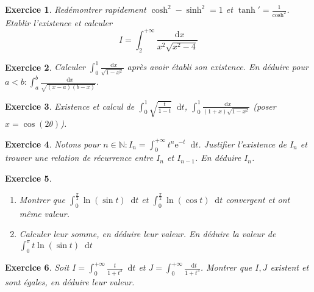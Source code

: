 \documentclass[12pt,a4paper]{article}
\newcommand{\N}{\mathbb{N}}
\newcommand{\E}{\mathrm{e}}
\newcommand{\diff}{\mathop{}\mathopen{}\mathrm{d}}%
{%
\theoremstyle{break}
\theoremprework{%
\rule{0.5\linewidth}{0.3pt}}
\theorempostwork{\hfill%
\rule{0.5\linewidth}{0.3pt}}
\theoremheaderfont{\scshape}
\theoremseparator{ ---}
\newtheorem{Prop}{%
\textcolor{blue}{Proposition}}[section]
}
\theoremstyle{break}
\newtheorem{Exo}{Exercice}
\begin{document}
\begin{Exo}
	Redémontrer rapidement $\cosh^2-\sinh^2=1$ et $\tanh'=\frac{1}{\cosh^2}$. Etablir l'existence et calculer $$I=\int_2^{+\infty}\frac{\diff x}{x^2\sqrt{x^2-4}}$$
\end{Exo}

\begin{Exo}
	Calculer $\displaystyle\int_{0}^{1}\frac{\diff x}{\sqrt{1-x^2}}$ après avoir établi son existence. En déduire pour $a<b:\displaystyle\int_{a}^{b}\frac{\diff x}{\sqrt{(x-a)(b-x)}}$.
\end{Exo}


\begin{Exo}
	Existence et calcul de $\displaystyle\int_0^1\sqrt{\frac{t}{1-t}}\diff t$, $\displaystyle\int_0^1\frac{\diff x}{(1+x)\sqrt{1-x^2}}$ (poser $x=\cos (2\theta)$).
\end{Exo}

\begin{Exo}
	Notons pour $n\in \N:I_n=\displaystyle\int_0^{+\infty}t^n\E^{-t}\diff t$. Justifier l'existence de $I_n$ et trouver une relation de récurrence entre $I_n$ et $I_{n-1}$. En déduire $I_n$.
\end{Exo}


\begin{Exo}\ 
	\begin{enumerate}
		\item Montrer que $\int_{ 0}^{\frac{\pi }{2}}\ln (\sin t)\diff t$ et $\int_{ 0}^{\frac{\pi }{2}}\ln \left( \cos t\right) \diff t$
		convergent et ont même valeur. 
		\item Calculer leur somme, en déduire leur valeur. En déduire la valeur de $\int_{0}^{\pi }t\ln (\sin t)\diff t$
	\end{enumerate}
\end{Exo}

\begin{Exo}
	Soit $I=\displaystyle\int_0^{+\infty}\frac{t}{1+t^3}\diff t$ et $J=\displaystyle\int_0^{+\infty}\frac{\diff t}{1+t^3}$. Montrer que $I,J$ existent et sont égales, en déduire leur valeur.
\end{Exo}
\end{document}
